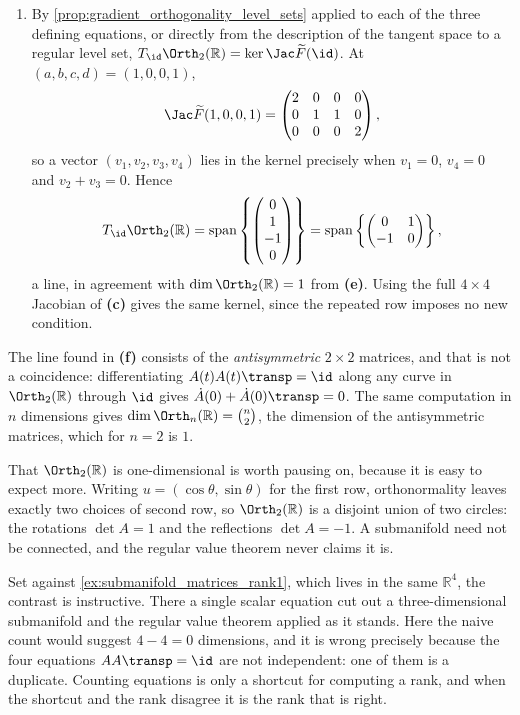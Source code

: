 \begin{exercisesolution}
\begin{enumerate}[label=\textbf{(\alph*)}]
  \item By \cref{prop:gradient_orthogonality_level_sets} applied to each of the three defining
    equations, or directly from the description of the tangent space to a regular level set,
    $T_{\id}\Orth_2(\mathbb{R}) = \ker \Jac \widetilde F(\id)$. At
    $(a,b,c,d) = (1,0,0,1)$,
\[\Jac \widetilde F(1,0,0,1) = \begin{pmatrix}
  2 & 0 & 0 & 0 \\
  0 & 1 & 1 & 0 \\
  0 & 0 & 0 & 2
\end{pmatrix},\]
    so a vector $(v_1,v_2,v_3,v_4)$ lies in the kernel precisely when $v_1 = 0$, $v_4 = 0$ and
    $v_2 + v_3 = 0$. Hence
\[T_{\id}\Orth_2(\mathbb{R}) = \operatorname{span}\left\{
  \begin{pmatrix} 0 \\ 1 \\ -1 \\ 0\end{pmatrix}\right\}
  = \operatorname{span}\left\{\begin{pmatrix} 0 & 1 \\ -1 & 0\end{pmatrix}\right\},\]
    a line, in agreement with $\dim \Orth_2(\mathbb{R}) = 1$ from \textbf{(e)}. Using the full
    $4\times4$ Jacobian of \textbf{(c)} gives the same kernel, since the repeated row imposes no
    new condition.
\end{enumerate}
\begin{remark}
The line found in \textbf{(f)} consists of the \emph{antisymmetric} $2\times2$ matrices, and that
is not a coincidence: differentiating $A(t)A(t)\transp = \id$ along any curve in
$\Orth_2(\mathbb{R})$ through $\id$ gives $\dot A(0) + \dot A(0)\transp = 0$. The same computation
in $n$ dimensions gives $\dim\Orth_n(\mathbb{R}) = \binom{n}{2}$, the dimension of the
antisymmetric matrices, which for $n=2$ is $1$.

That $\Orth_2(\mathbb{R})$ is one-dimensional is worth pausing on, because it is easy to expect
more. Writing $u = (\cos\theta,\sin\theta)$ for the first row, orthonormality leaves exactly two
choices of second row, so $\Orth_2(\mathbb{R})$ is a disjoint union of two circles: the rotations
$\det A = 1$ and the reflections $\det A = -1$. A submanifold need not be connected, and the
regular value theorem never claims it is.

Set against \cref{ex:submanifold_matrices_rank1}, which lives in the same $\mathbb{R}^4$, the
contrast is instructive. There a single scalar equation cut out a three-dimensional submanifold and
the regular value theorem applied as it stands. Here the naive count would suggest
$4 - 4 = 0$ dimensions, and it is wrong precisely because the four equations $AA\transp = \id$ are
not independent: one of them is a duplicate. Counting equations is only a shortcut for computing a
rank, and when the shortcut and the rank disagree it is the rank that is right.
\end{remark}
\end{exercisesolution}

